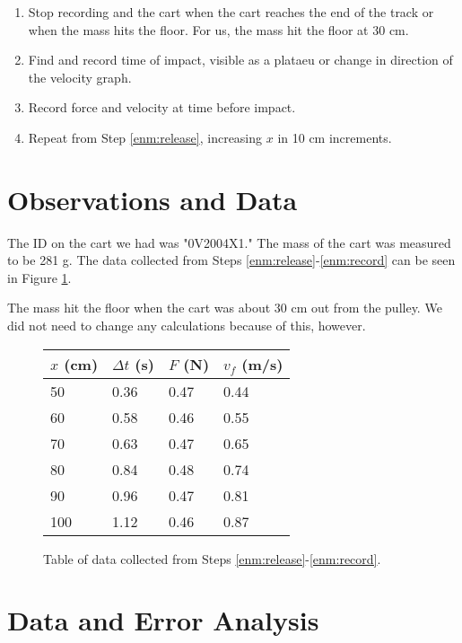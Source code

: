\documentclass[twocolumn]{article}
\begin{document}
\begin{enumerate}
    \item Stop recording and the cart when the cart reaches the end of the track
        or when the mass hits the floor. For us, the mass hit the floor at 30
        cm.

    \item Find and record time of impact, visible as a plataeu or change in
        direction of the velocity graph.

    \item \label{enm:record} Record force and velocity at time before impact.

    \item Repeat from Step \ref{enm:release}, increasing $x$ in 10 cm
        increments.

\end{enumerate}


\section{Observations and Data}

The ID on the cart we had was "0V2004X1." The mass of the cart was measured to
be 281 g. The data collected from Steps \ref{enm:release}-\ref{enm:record} can
be seen in Figure \ref{fig:data}.

The mass hit the floor when the cart was about 30 cm out from the pulley. We
did not need to change any calculations because of this, however.

\begin{figure}[h]
    \centering
    \begin{tabular}{| l | l | l | l |}
        \hline
        $x$ (cm) & $\Delta t$ (s) & $F$ (N) & $v_f$ (m/s) \\ \hline
        50 & 0.36 & 0.47 & 0.44 \\ 
        60 & 0.58 & 0.46 & 0.55 \\ 
        70 & 0.63 & 0.47 & 0.65 \\ 
        80 & 0.84 & 0.48 & 0.74 \\ 
        90 & 0.96 & 0.47 & 0.81 \\ 
        100 & 1.12 & 0.46 & 0.87 \\
        \hline
    \end{tabular}
    \caption{Table of data collected from Steps \ref{enm:release}-\ref{enm:record}.}
    \label{fig:data}
\end{figure}

\section{Data and Error Analysis}
\end{document}
